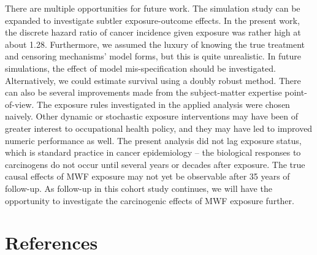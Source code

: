\documentclass[
  11pt,
]{article}
\begin{document}
There are multiple opportunities for future work. The simulation study
can be expanded to investigate subtler exposure-outcome effects. In the
present work, the discrete hazard ratio of cancer incidence given
exposure was rather high at about 1.28. Furthermore, we assumed the
luxury of knowing the true treatment and censoring mechanisms' model
forms, but this is quite unrealistic. In future simulations, the effect
of model mis-specification should be investigated. Alternatively, we
could estimate survival using a doubly robust method. There can also be
several improvements made from the subject-matter expertise
point-of-view. The exposure rules investigated in the applied analysis
were chosen naively. Other dynamic or stochastic exposure interventions
may have been of greater interest to occupational health policy, and
they may have led to improved numeric performance as well. The present
analysis did not lag exposure status, which is standard practice in
cancer epidemiology -- the biological responses to carcinogens do not
occur until several years or decades after exposure. The true causal
effects of MWF exposure may not yet be observable after 35 years of
follow-up. As follow-up in this cohort study continues, we will have the
opportunity to investigate the carcinogenic effects of MWF exposure
further.

\newpage

\hypertarget{references}{%
\section*{References}\label{references}}
\end{document}

